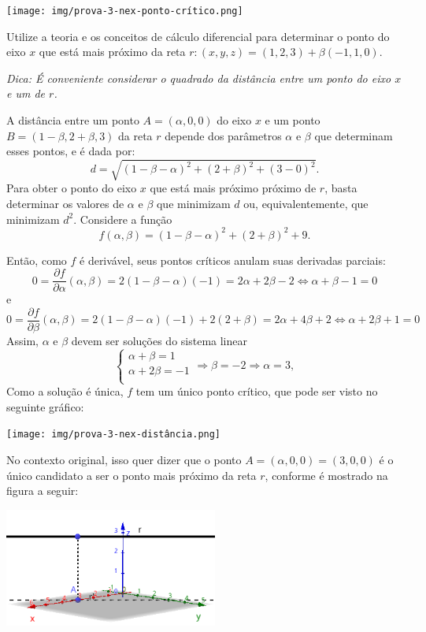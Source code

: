 \documentclass[12pt,a4paper]{article}
\begin{document}
\begin{ExerciseList}
\begin{center}
  \texttt{[image: img/prova-3-nex-ponto-crítico.png]}
\end{center}

\Exercise[title={2,0}] Utilize a teoria e os conceitos de cálculo diferencial para determinar o ponto do eixo $x$ que está mais próximo da reta $r: (x, y, z) = (1, 2, 3) + \beta (-1, 1, 0)$.

\textit{Dica: É conveniente considerar o quadrado da distância entre um ponto do eixo $x$ e um de $r$.}

\Answer A distância entre um ponto $A = (\alpha, 0, 0)$ do eixo $x$ e um ponto $B = (1 - \beta, 2 + \beta, 3)$ da reta $r$ depende dos parâmetros $\alpha$ e $\beta$ que determinam esses pontos, e é dada por:
\[
d
= \sqrt{(1 - \beta - \alpha)^2 + (2 + \beta)^2 + (3 - 0)^2}.
\]
Para obter o ponto do eixo $x$ que está mais próximo próximo de $r$, basta determinar os valores de $\alpha$ e $\beta$ que minimizam $d$ ou, equivalentemente, que minimizam $d^2$. Considere a função
\[
  f(\alpha, \beta) = (1 - \beta - \alpha)^2 + (2 + \beta)^2 + 9.
\]

Então, como $f$ é derivável, seus pontos críticos anulam suas derivadas parciais:
\[
  0 = \frac{\partial f}{\partial \alpha}(\alpha, \beta)
  = 2(1 - \beta - \alpha)(-1)
  = 2\alpha + 2\beta - 2
  \Leftrightarrow
  \alpha + \beta - 1 = 0
\]
e
\[
  0 = \frac{\partial f}{\partial \beta}(\alpha, \beta)
  = 2(1 - \beta - \alpha)(-1) + 2(2 + \beta)
  = 2\alpha + 4\beta + 2
  \Leftrightarrow
  \alpha + 2\beta + 1 = 0
\]
Assim, $\alpha$ e $\beta$ devem ser soluções do sistema linear
\[
\begin{cases}
  \alpha + \beta = 1\\
  \alpha + 2\beta = -1\\
\end{cases}
\Rightarrow
\beta = -2
\Rightarrow
\alpha = 3,
\]
Como a solução é única, $f$ tem um único ponto crítico, que pode ser visto no seguinte gráfico:

\begin{center}
  \texttt{[image: img/prova-3-nex-distância.png]}
\end{center}

No contexto original, isso quer dizer que o ponto $A = (\alpha, 0, 0) = (3, 0, 0)$ é o único candidato a ser o ponto mais próximo da reta $r$, conforme é mostrado na figura a seguir:

\begin{center}
  \includegraphics[width=7.0cm]{img/prova-3-nex-reta.png}
\end{center}


\end{ExerciseList}
\end{document}
